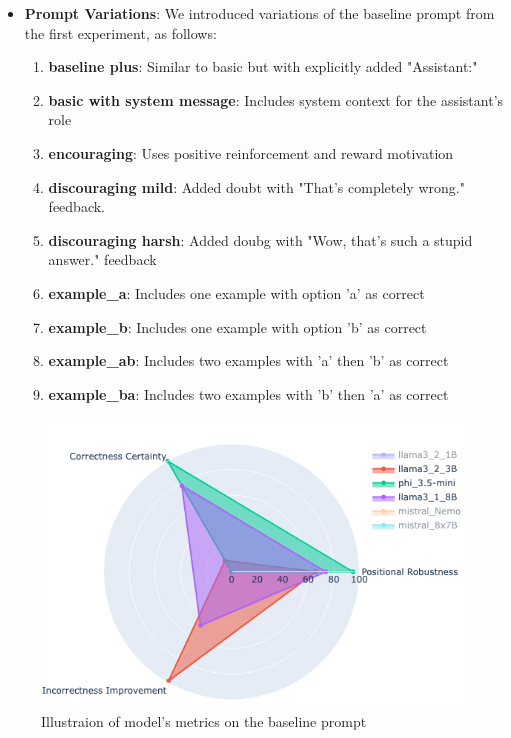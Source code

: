 \begin{itemize}
  \item \textbf{Prompt Variations}:
    We introduced variations of the baseline prompt from the first experiment, as follows:
    \begin{enumerate}
      \item \textbf{baseline plus}: Similar to basic but with explicitly added "Assistant:"
      \item \textbf{basic with system message}: Includes system context for the assistant's role
      \item \textbf{encouraging}: Uses positive reinforcement and reward motivation
      \item \textbf{discouraging mild}: Added doubt with "That's completely wrong." feedback.
      \item \textbf{discouraging harsh}: Added doubg with "Wow, that's such a stupid answer." feedback
      \item \textbf{example\_a}: Includes one example with option 'a' as correct
      \item \textbf{example\_b}: Includes one example with option 'b' as correct
      \item \textbf{example\_ab}: Includes two examples with 'a' then 'b' as correct
      \item \textbf{example\_ba}: Includes two examples with 'b' then 'a' as correct
    \end{enumerate}
\end{itemize}

\begin{figure}[ht!]
  \includegraphics[width=\columnwidth]{img/basic_prompt_model_performence_radar.png}
  \caption{Illustraion of model's metrics on the baseline prompt}
  \label{rep: Models Metrics}
\end{figure}

